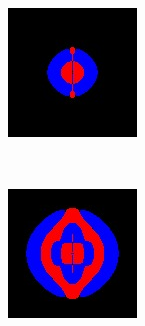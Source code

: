 \begin{figure}[p]
    \centering
    \begin{subfigure}[b]{0.3\textwidth}
        \includegraphics[width=\textwidth]{include/graphics/pml-off-0}
    \end{subfigure}
    ~
    \begin{subfigure}[b]{0.3\textwidth}
        \includegraphics[width=\textwidth]{include/graphics/pml-off-1}

\end{subfigure}
\end{figure}
